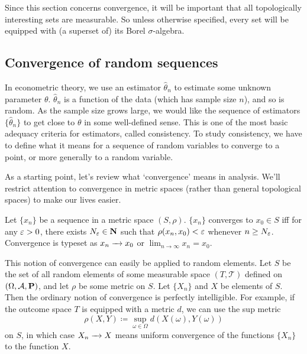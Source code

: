 \documentclass[11pt,letterpaper,reqno,oneside]{article}
\begin{document}
Since this section concerns convergence, it will be important that all topologically interesting sets are measurable. So unless otherwise specified, every set will be equipped with (a superset of) its Borel $\sigma$-algebra.



\subsection{Convergence of random sequences}
\label{sec:modes_of_convergence:convergence_random_sequences}

In econometric theory, we use an estimator $\widehat{\theta}_n$ to estimate some unknown parameter $\theta$. $\widehat{\theta}_n$ is a function of the data (which has sample size $n$), and so is random. As the sample size grows large, we would like the sequence of estimators $\bigl\{ \widehat{\theta}_n \bigr\}$ to get close to $\theta$ in some well-defined sense. This is one of the most basic adequacy criteria for estimators, called consistency. To study consistency, we have to define what it means for a sequence of random variables to converge to a point, or more generally to a random variable.

As a starting point, let's review what `convergence' means in analysis. We'll restrict attention to convergence in metric spaces (rather than general topological spaces) to make our lives easier.
%
\begin{definition}
	Let $\{x_n\}$ be a sequence in a metric space $(S,\rho)$. $\{ x_n \}$ converges to $x_0 \in S$ iff for any $\varepsilon > 0$, there exists $N_\varepsilon \in \mathbf{N}$ such that $\rho(x_n,x_0) < \varepsilon$ whenever $n \geq N_\varepsilon$. Convergence is typeset as $x_n \xrightarrow{\;\;\;} x_0$ or $\lim_{n\to\infty} x_n = x_0$.
\end{definition}
%
This notion of convergence can easily be applied to random elements. Let $S$ be the set of all random elements of some measurable space $(T,\mathcal{T})$ defined on $(\Omega,\mathcal{A},\mathbf{P})$, and let $\rho$ be some metric on $S$. Let $\{ X_n \}$ and $X$ be elements of $S$. Then the ordinary notion of convergence is perfectly intelligible. For example, if the outcome space $T$ is equipped with a metric $d$, we can use the sup metric
%
\begin{equation*}
	\rho(X,Y) \coloneqq \sup_{\omega \in \Omega} d\left(X(\omega),Y(\omega)\right)
\end{equation*}
%
on $S$, in which case $X_n \xrightarrow{\;\;\;} X$ means uniform convergence of the functions $\{ X_n \}$ to the function $X$.
\end{document}
